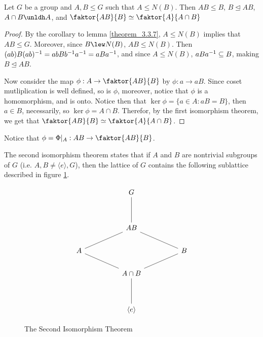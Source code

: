 \begin{theorem}\label{theorem_3.4.4}
  Let $G$ be a group and  $A,B \leq G$ such that  $A \leq N(B)$. Then $AB \leq
  B$,  $B \unlhd AB$,  $A \cap B \unldh A$, and  $\faktor{AB}{B} \simeq
  \faktor{A}{A \cap B}$
\end{theorem}
\begin{proof}
  By the corollary to lemma \ref{theorem_3.3.7}, $A \leq N(B)$ implies that
  $AB \leq G$. Moreover, since  $B \lew N(B)$, $AB \leq N(B)$. Then
  $(ab)B(ab)^{-1}=abBb^{-1}a^{-1}=aBa^{-1}$, and since $A \leq N(B)$,
  $aBa^{-1} \subseteq B$, making $B \unlhd AB$.

  Now consider the map $\phi:A \rightarrow \faktor{AB}{B}$ by $\phi:a
  \rightarrow aB$. Since coset mutliplication is well defined, so is $\phi$,
  moreover, notice that  $\phi$ is a homomorphism, and is onto. Notice then
  that  $\ker{\phi}=\{a \in A : aB=B\}$, then $a \in B$, necessarily, so
  $\ker{\phi}=A \cap B$. Therefor, by the first isomorphism theorem, we get
  that $\faktor{AB}{B} \simeq \faktor{A}{A \cap B}$.
\end{proof}
\begin{remark}
  Notice that $\phi=\Phi|_{A}:AB \rightarrow \faktor{AB}{B}$.
\end{remark}
\begin{remark}
  The second isomorphism theorem states that if $A$ and $B$ are nontrivial
  subgroups of $G$  (i.e. $A,B \neq \langle e \rangle, G$), then the lattice of
  $G$ contains the following sublattice described in figure
  \ref{figure_3.3}.
\end{remark}

\begin{figure}[h]
  \[\begin{tikzcd}
  && G \\
  \\
  && AB \\
    A &&&& B \\
      && {A \cap B} \\
      \\
      && {\langle e \rangle}
      \arrow[no head, from=1-3, to=3-3]
      \arrow[no head, from=3-3, to=4-1]
      \arrow[no head, from=4-1, to=5-3]
      \arrow[no head, from=5-3, to=4-5]
      \arrow[no head, from=4-5, to=3-3]
      \arrow[no head, from=5-3, to=7-3]
  \end{tikzcd}\]
  \caption{The Second Isomorphism Theorem}
  \label{figure_3.3}
\end{figure}

